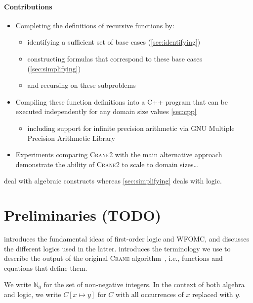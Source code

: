 \documentclass{article}
\theoremstyle{definition}
\newcommand{\Cranetwo}{\textsc{Crane2}}
\begin{document}

\paragraph{Contributions}
\begin{itemize}
  \item Completing the definitions of recursive functions by:
  \begin{itemize}
    \item identifying a sufficient set of base cases (\cref{sec:identifying})
    \item constructing formulas that correspond to these base cases
          (\cref{sec:simplifying})
    \item and recursing on these subproblems
  \end{itemize}
  \item Compiling these function definitions into a C++ program that can be
        executed independently for any domain size values \cref{sec:cpp}
        \begin{itemize}
          \item including support for infinite precision arithmetic via GNU
                Multiple Precision Arithmetic Library
        \end{itemize}
  \item Experiments comparing \Cranetwo{} with the main alternative approach
        demonstrate the ability of \Cranetwo{} to scale to domain sizes\dots
\end{itemize}

 deal with algebraic constructs whereas
\cref{sec:simplifying} deals with logic.

\section{Preliminaries (TODO)}

 introduces the fundamental ideas of first-order logic and
WFOMC, and discusses the different logics used in the latter.\@
{} introduces the terminology we use to describe the output of
the original \textsc{Crane} algorithm~\cite{DBLP:conf/kr/DilkasB23}, i.e.,
functions and equations that define them.

We write $\mathbb{N}_{0}$ for the set of non-negative integers. In the context
of both algebra and logic, we write $C[x \mapsto y]$ for $C$ with all
occurrences of $x$ replaced with $y$.
\end{document}
